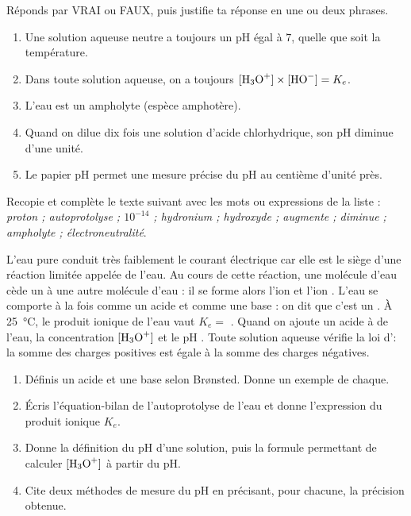 \documentclass[11pt]{article}
\begin{document}
\begin{exercice}
Réponds par VRAI ou FAUX, puis justifie ta réponse en une ou deux phrases.
\begin{enumerate}
\item Une solution aqueuse neutre a toujours un pH égal à $7$, quelle que soit la température.
\item Dans toute solution aqueuse, on a toujours $[\ce{H3O+}] \times [\ce{HO-}] = K_e$.
\item L'eau est un ampholyte (espèce amphotère).
\item Quand on dilue dix fois une solution d'acide chlorhydrique, son pH diminue d'une unité.
\item Le papier pH permet une mesure précise du pH au centième d'unité près.
\end{enumerate}
\end{exercice}

\begin{exercice}
Recopie et complète le texte suivant avec les mots ou expressions de la liste : \emph{proton ; autoprotolyse ; $10^{-14}$ ; hydronium ; hydroxyde ; augmente ; diminue ; ampholyte ; électroneutralité}.

L'eau pure conduit très faiblement le courant électrique car elle est le siège d'une réaction limitée appelée \dotfill de l'eau. Au cours de cette réaction, une molécule d'eau cède un \dotfill à une autre molécule d'eau : il se forme alors l'ion \dotfill{}  et l'ion \dotfill{} . L'eau se comporte à la fois comme un acide et comme une base : on dit que c'est un \dotfill. À \SI{25}{\celsius}, le produit ionique de l'eau vaut $K_e = $ \dotfill. Quand on ajoute un acide à de l'eau, la concentration $[\ce{H3O+}]$ \dotfill{} et le pH \dotfill. Toute solution aqueuse vérifie la loi d'\dotfill : la somme des charges positives est égale à la somme des charges négatives.
\end{exercice}

\begin{exercice}
\begin{enumerate}
\item Définis un acide et une base selon Brønsted. Donne un exemple de chaque.
\item Écris l'équation-bilan de l'autoprotolyse de l'eau et donne l'expression du produit ionique $K_e$.
\item Donne la définition du pH d'une solution, puis la formule permettant de calculer $[\ce{H3O+}]$ à partir du pH.
\item Cite deux méthodes de mesure du pH en précisant, pour chacune, la précision obtenue.
\end{enumerate}
\end{exercice}
\end{document}
